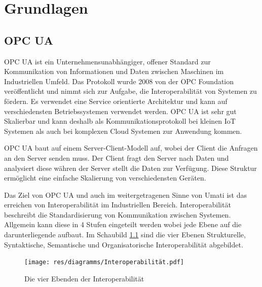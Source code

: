 \documentclass[a4paper, 12pt, oneside]{scrbook}
\begin{document}
	
\chapter{Grundlagen}\label{ch:Grundlagen}
	
	
	
	\section{OPC UA}
	
	
	
	 \ac{OPC UA} ist ein Unternehmensunabhängiger, offener Standard zur Kommunikation von Informationen und Daten zwischen Maschinen im Industriellen Umfeld. Das Protokoll wurde 2008 von der OPC Foundation veröffentlicht und nimmt sich zur Aufgabe, die Interoperabilität von Systemen zu fördern. Es verwendet eine Service orientierte Architektur und kann auf verschiedensten Betriebssystemen verwendet werden. OPC UA ist sehr gut Skalierbar und kann deshalb als Kommunikationsprotokoll bei kleinen \ac{IoT} Systemen als auch bei komplexen Cloud Systemen zur Anwendung kommen.
	
	 OPC UA baut auf einem Server-Client-Modell auf, wobei der Client die Anfragen an den Server senden muss. Der Client fragt den Server nach Daten und analysiert diese währen der Server stellt die Daten zur Verfügung. Diese Struktur ermöglicht eine einfache Skalierung von verschiedensten Geräten. 
	
	
	
	 Das Ziel von OPC UA und auch im weitergetragenen Sinne von Umati ist das erreichen von Interoperabilität im Industriellen Bereich. Interoperabilität beschreibt die Standardisierung von Kommunikation zwischen Systemen. Allgemein kann diese in 4 Stufen eingeteilt werden wobei jede Ebene auf die darunterliegende aufbaut. Im Schaubild \ref{fig:Interoperabilität} sind die vier Ebenen Strukturelle, Syntaktische, Semantische und Organisatorische Interoperabilität abgebildet.
	
	\begin{figure}[h]
		\centering
		\texttt{[image: res/diagramms/Interoperabilität.pdf]}
		\caption{Die vier Ebenden der Interoperabilität}
		\label{fig:Interoperabilität}
	\end{figure}
\end{document}

